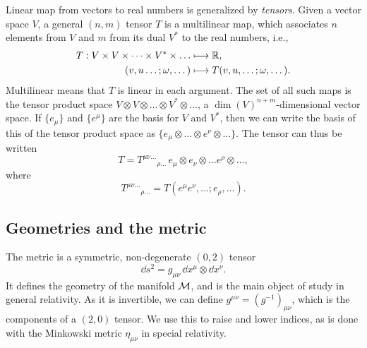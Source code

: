 Linear map from vectors to real numbers is generalized by \emph{tensors}.
Given a vector space $V$, a general $(n, m)$ tensor $T$ is a multilinear map, which associates $n$ elements from $V$ and $m$ from its dual $V^*$ to the real numbers, i.e.,
%
\begin{align}
    T: V \times V \times \dots\times V^* \times \dots &\longmapsto \mathbb{R}, \\
    (v, u\dots; \omega, \dots) & \longmapsto T(v, u, \dots; \omega, \dots).
\end{align}
%
Multilinear means that $T$ is linear in each argument.
The set of all such maps is the tensor product space $V\otimes V \otimes \dots \otimes V^* \otimes \dots$, a $\dim(V)^{n+m}$-dimensional vector space.
If $\{e_\mu\}$ and $\{e^\mu\}$ are the basis for $V$ and $V^*$, then we can write the basis of this of the tensor product space as $ \{e_{\mu} \otimes\dots \otimes e^{\nu} \otimes \dots \}$.
The tensor can thus be written
%
\begin{equation}
    T = T^{\mu \nu\dots}{}_{\rho\dots} \, e_{\mu}\otimes e_\nu \otimes \dots e^\rho\otimes\dots, 
\end{equation}
% 
where
%
\begin{equation}
    T^{\mu \nu\dots}{}_{\rho\dots} = T(e^\mu e^\nu, \dots; e_\rho, \dots).
\end{equation}


\subsection*{Geometries and the metric}

The metric is a symmetric, non-degenerate $(0, 2)$ tensor
%
\begin{equation}
    \dd s^2 = g_{\mu \nu} \, \dd x^\mu \otimes \dd x^\nu.
\end{equation}
%
It defines the geometry of the manifold $\mathcal{M}$, and is the main object of study in general relativity.
As it is invertible, we can define $g^{\mu \nu} = (g^{-1})_{\mu \nu}$, which is the components of a $(2, 0)$ tensor.
We use this to raise and lower indices, as is done with the Minkowski metric $\eta_{\mu \nu}$ in special relativity.

